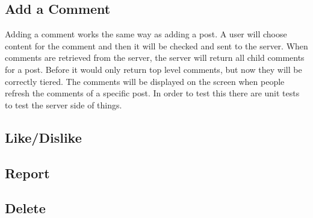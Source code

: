 \documentclass[12pt]{article}
\begin{document}
\subsection{Add a Comment}

Adding a comment works the same way as adding a post.  A user will choose content 
for the comment and then it will be checked and sent to the server.  When comments 
are retrieved from the server, the server will return all child comments for a post.  
Before it would only return top level comments, but now they will be correctly 
tiered.  The comments will be displayed on the screen when people refresh the 
comments of a specific post.  In order to test this there are unit tests to test 
the server side of things.

\subsection{Like/Dislike}

\subsection{Report}

\subsection{Delete}
\end{document}
